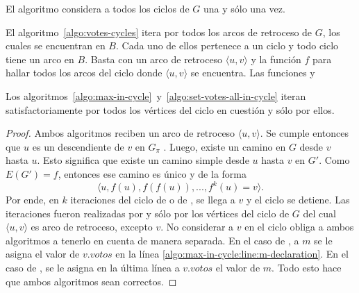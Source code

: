 \begin{lemma}\label{lemma:reassign-votes}
    El algoritmo \cyclevotescaption \;considera a todos los ciclos de $G$ una y s\'olo una vez. 
\end{lemma}


El algoritmo~\ref{algo:votes-cycles} itera por todos los arcos de retroceso de $G$, los cuales se encuentran en $B$. Cada uno de ellos pertenece a un ciclo y todo ciclo tiene un arco en $B$.  Basta con un arco de retroceso $\langle u, v \rangle$ y la funci\'on $f$ para hallar todos los arcos del ciclo donde $\langle u, v \rangle$ se encuentra. Las funciones \maxincyclecaption \;y \setvotestoallincyclecaption  {}

\begin{lemma}\label{lemma:cycle-iteration}
    Los algoritmos~\ref{algo:max-in-cycle}~y~\ref{algo:set-votes-all-in-cycle} iteran satisfactoriamente por todos los v\'ertices del ciclo en cuesti\'on y s\'olo por ellos.
\end{lemma}

\begin{proof}
    Ambos algoritmos reciben un arco de retroceso $\langle u, v \rangle$. Se cumple entonces que $u$ es un descendiente de $v$ en $G_\pi$ \citep{intro-to-algo-3}. Luego, existe un camino en $G$ desde $v$ hasta $u$. Esto significa que existe  un camino simple desde $u$ hasta $v$ en $G'$. Como $E(G') = f$, entonces ese camino es \'unico y de la forma
    $$
    \langle u, f(u), f(f(u)), ..., f^k(u) = v \rangle.
    $$
    Por ende, en $k$ iteraciones del ciclo de \maxincyclecaption \;o de \setvotestoallincyclecaption, se llega a $v$ y el ciclo se detiene. Las iteraciones fueron realizadas  por y s\'olo por los v\'ertices del ciclo de $G$ del cual $\langle u, v \rangle$ es arco de retroceso, excepto $v$. No considerar a $v$ en el ciclo obliga a ambos algoritmos a tenerlo en cuenta de manera separada.  En el caso de \maxincyclecaption, a $m$ se le asigna el valor de $v.votos$ en la l\'inea \ref{algo:max-in-cycle:line:m-declaration}. En el caso de \setvotestoallincyclecaption, se le asigna en la \'ultima l\'inea a $v.votos$ el valor de $m$. Todo esto hace que ambos algoritmos sean correctos.

\end{proof}

